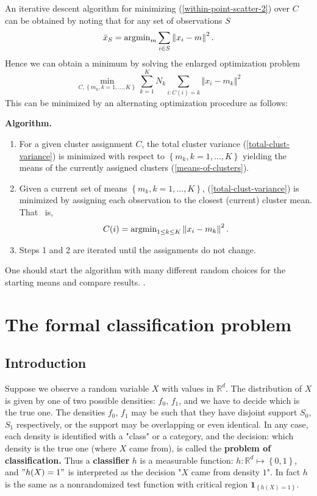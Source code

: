 \documentclass[11pt,twoside]{article}%
\theoremstyle{change}
\begin{document}
An iterative descent algorithm for minimizing (\ref{within-point-scatter-2})
over $C$ can be obtained by noting that for any set of observations $S$%
\begin{equation}
\bar{x}_{S}=\text{\textrm{argmin}}_{m}\sum_{i\in S}\left\Vert x_{i}%
-m\right\Vert ^{2}.\label{means-of-clusters}%
\end{equation}
Hence we can obtain a minimum by solving the enlarged optimization problem%
\begin{equation}
\min_{C,\left\{  m_{k},k=1,\ldots,K\right\}  }\sum_{k=1}^{K}N_{k}%
\sum_{i:C(i)=k}\left\Vert x_{i}-m_{k}\right\Vert ^{2}%
\label{total-clust-variance}%
\end{equation}
This can be minimized by an alternating optimization procedure as follows:

\textbf{Algorithm. }

\begin{enumerate}
\item For a given cluster assignment $C$, the total cluster variance
(\ref{total-clust-variance}) is minimized with respect to $\left\{
m_{k},k=1,\ldots,K\right\}  $ yielding the means of the currently assigned
clusters (\ref{means-of-clusters}).

\item Given a current set of means $\left\{  m_{k},k=1,\ldots,K\right\}  $,
(\ref{total-clust-variance}) is minimized by assigning each observation to the
closest (current) cluster mean. That \ is,%
\[
C(i)=\text{\textrm{argmin}}_{1\leq k\leq K}\left\Vert x_{i}-m_{k}\right\Vert
^{2}.
\]


\item Steps 1 and 2 are iterated until the assignments do not change.
\end{enumerate}

One should start the algorithm with many different random choices for the
starting means and compare results. .

\section{The formal classification problem}

\subsection{Introduction}

Suppose we observe a random variable $X$ with values in $\mathbb{R}^{d}$. The
distribution of $X$ is given by one of two possible densities: $f_{0}$,
$f_{1}$, and we have to decide which is the true one. The densities $f_{0}$,
$f_{1}$ may be such that they have disjoint support $S_{0}$, $S_{1}$
respectively, or the support may be overlapping or even identical. In any
case, each density is identified with a "class" or a category, and the
decision: which density is the true one (where $X$ came from), is called the
\textbf{problem of classification.} Thus a \textbf{classifier }$h$ is a
measurable function: $h:\mathbb{R}^{d}\mapsto\left\{  0,1\right\}  $, and
$"h(X)=1"$ is interpreted as the decision "$X$ came from density $1$". In fact
$h$ is the same as a nonrandomized test function with critical region
$\mathbf{1}_{\left\{  h(X)=1\right\}  }$.
\end{document}
